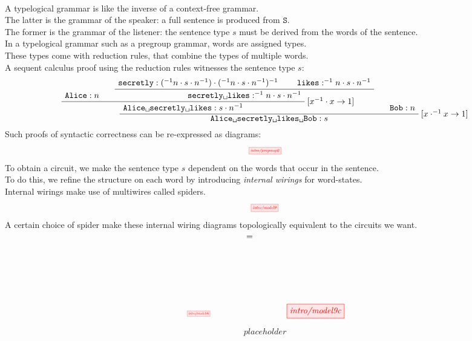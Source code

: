\begin{fullwidth}
\begin{centering}
\\
A typelogical grammar is like the inverse of a context-free grammar.\\
The latter is the grammar of the speaker: a full sentence is produced from $\texttt{S}$.\\
The former is the grammar of the listener: the sentence type $s$ must be derived from the words of the sentence.\\
In a typelogical grammar such as a pregroup grammar, words are assigned types.\\
These types come with reduction rules, that combine the types of multiple words.\\
A sequent calculus proof using the reduction rules witnesses the sentence type $s$:
\[
\AxiomC{$\texttt{Alice} : n$}
\AxiomC{$\texttt{secretly} : (^{-1}n \cdot s \cdot n^{-1}) \cdot (^{-1}n \cdot s \cdot n^{-1})^{-1}$}
\AxiomC{$\texttt{likes} : ^{-1}n \cdot s \cdot n^{-1}$}
\BinaryInfC{$\texttt{secretly\textvisiblespace likes} : ^{-1}n \cdot s \cdot n^{-1}$}
\RightLabel{$[x^{-1} \cdot x \rightarrow 1]$}
\BinaryInfC{$\texttt{Alice\textvisiblespace secretly\textvisiblespace likes} : s \cdot n^{-1}$}
\RightLabel{$[x \cdot ^{-1}x \rightarrow 1]$}
\AxiomC{$\texttt{Bob} : n$}
\BinaryInfC{$\texttt{Alice\textvisiblespace secretly\textvisiblespace likes\textvisiblespace Bob} : s$}
\RightLabel{$[x^{-1} \cdot x \rightarrow 1]$}
\DisplayProof
\]
Such proofs of syntactic correctness can be re-expressed as diagrams:
\[\scalebox{0.5}{\tikzfig{intro/pregroup0}}\]
To obtain a circuit, we make the sentence type $s$ dependent on the words that occur in the sentence.\\
To do this, we refine the structure on each word by introducing \emph{internal wirings} for word-states.\\
Internal wirings make use of multiwires called spiders.\\
\[\scalebox{0.5}{\tikzfig{intro/model9}}\]
A certain choice of spider make these internal wiring diagrams topologically equivalent to the circuits we want.
\[\scalebox{0.4}{\tikzfig{intro/model9b}} \quad\quad\quad\quad \raisebox{3.2cm}{=} \quad\quad\quad\quad \tikzfig{intro/model9c}\]


\[placeholder\]

\end{centering}
\end{fullwidth}

